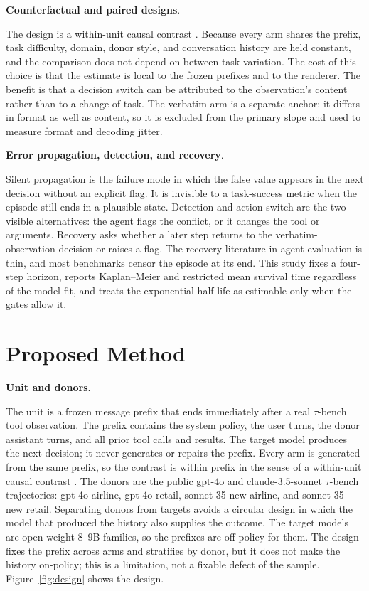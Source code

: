 \documentclass[a4paper,fleqn]{cas-sc}
\begin{document}
\noindent\textbf{Counterfactual and paired designs}.\

The design is a within-unit causal contrast \cite{causal}. Because every arm shares the prefix,
task difficulty, domain, donor style, and conversation history are held constant, and the
comparison does not depend on between-task variation. The cost of this choice is that the
estimate is local to the frozen prefixes and to the renderer. The benefit is that a decision
switch can be attributed to the observation's content rather than to a change of task. The
verbatim arm is a separate anchor: it differs in format as well as content, so it is excluded
from the primary slope and used to measure format and decoding jitter.

\noindent\textbf{Error propagation, detection, and recovery}.\

Silent propagation is the failure mode in which the false value appears in the next decision
without an explicit flag. It is invisible to a task-success metric when the episode still ends
in a plausible state. Detection and action switch are the two visible alternatives: the agent
flags the conflict, or it changes the tool or arguments. Recovery asks whether a later step
returns to the verbatim-observation decision or raises a flag. The recovery literature in agent
evaluation is thin, and most benchmarks censor the episode at its end. This study fixes a
four-step horizon, reports Kaplan--Meier and restricted mean survival time regardless of the
model fit, and treats the exponential half-life as estimable only when the gates allow it.

\section{Proposed Method}\label{sec:method}

\noindent\textbf{Unit and donors}.\

The unit is a frozen message prefix that ends immediately after a real $\tau$-bench tool
observation. The prefix contains the system policy, the user turns, the donor assistant turns,
and all prior tool calls and results. The target model produces the next decision; it never
generates or repairs the prefix. Every arm is generated from the same prefix, so the contrast is
within prefix in the sense of a within-unit causal contrast \cite{causal}. The donors are the
public gpt-4o and claude-3.5-sonnet $\tau$-bench trajectories: gpt-4o airline, gpt-4o retail,
sonnet-35-new airline, and sonnet-35-new retail. Separating donors from targets avoids a circular
design in which the model that produced the history also supplies the outcome. The target models
are open-weight 8--9B families, so the prefixes are off-policy for them. The design fixes the
prefix across arms and stratifies by donor, but it does not make the history on-policy; this is a
limitation, not a fixable defect of the sample. Figure~\ref{fig:design} shows the design.
\end{document}
